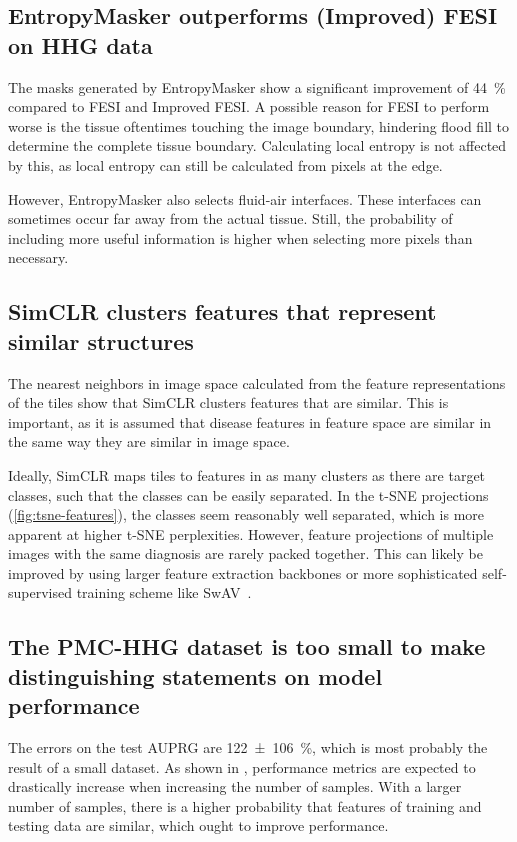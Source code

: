 \subsection{EntropyMasker outperforms (Improved) FESI on HHG data}
The masks generated by EntropyMasker show a significant improvement of \qty{44}{\percent} compared to FESI and Improved FESI.
A possible reason for FESI to perform worse is the tissue oftentimes touching the image boundary, hindering flood fill to determine the complete tissue boundary.
Calculating local entropy is not affected by this, as local entropy can still be calculated from pixels at the edge.

However, EntropyMasker also selects fluid-air interfaces.
These interfaces can sometimes occur far away from the actual tissue.
Still, the probability of including more useful information is higher when selecting more pixels than necessary.

\subsection{SimCLR clusters features that represent similar structures}
The nearest neighbors in image space calculated from the feature representations of the tiles show that SimCLR clusters features that are similar.
This is important, as it is assumed that disease features in feature space are similar in the same way they are similar in image space.

Ideally, SimCLR maps tiles to features in as many clusters as there are target classes, such that the classes can be easily separated.
In the t-SNE projections (\cref{fig:tsne-features}), the classes seem reasonably well separated, which is more apparent at higher t-SNE perplexities.
However, feature projections of multiple images with the same diagnosis are rarely packed together.
This can likely be improved by using larger feature extraction backbones or more sophisticated self-supervised training scheme like SwAV~\cite{Caron2020}.

\subsection{The PMC-HHG dataset is too small to make distinguishing statements on model performance}
The errors on the test AUPRG are \qty{122 \pm 106}{\percent}, which is most probably the result of a small dataset.
As shown in \cite{Schirris2022}, performance metrics are expected to drastically increase when increasing the number of samples.
With a larger number of samples, there is a higher probability that features of training and testing data are similar, which ought to improve performance.

